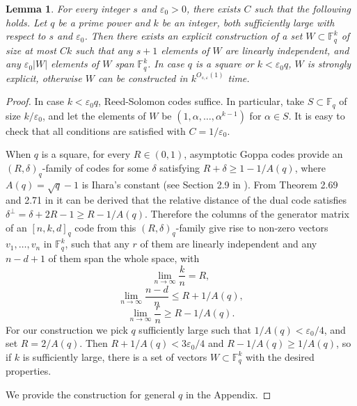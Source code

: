 \documentclass[11pt]{article}
\theoremstyle{plain}
\newtheorem{lemma}[theorem]{Lemma}
\theoremstyle{definition}
\begin{document}
\begin{lemma}\label{lemma:constr1}
For every integer $s$ and $\varepsilon_0>0$, there exists $C$ such that the following holds. 
Let $q$ be a prime power and $k$ be an integer, both sufficiently large with respect to $s$ and $\varepsilon_0$. Then there exists an explicit construction of a set $W\subset \mathbb{F}_q^k$ of size at most $Ck$ such that any $s+1$ elements of $W$ are linearly independent, and any $\varepsilon_0 |W|$ elements of $W$ span $\mathbb{F}_q^k$. In case $q$ is a square or $k<\varepsilon_0 q$, $W$ is strongly explicit, otherwise $W$ can be constructed in $k^{O_{s,\varepsilon}(1)}$ time.
\end{lemma}
\begin{proof}
    In case $k<\varepsilon_0 q$, Reed-Solomon codes suffice. In particular, take $S\subset \mathbb{F}_q$ of size $k/\varepsilon_0$, and let the elements of $W$ be $(1,\alpha,\dots,\alpha^{k-1})$ for $\alpha\in S$. It is easy to check that all conditions are satisfied with $C=1/\varepsilon_0$.
    
    When $q$ is a square, for every $R\in (0,1)$, asymptotic Goppa codes provide an $(R,\delta)_q$-family of codes for some $\delta$ satisfying $R+\delta \geq  1-1/A(q)$, where $A(q)=\sqrt{q}-1$ is Ihara's constant (see Section 2.9 in \cite{hoholdt1998algebraic}). 
    From Theorem 2.69 and 2.71 in \cite{hoholdt1998algebraic} it can be derived that the relative distance of the dual code satisfies 
$\delta^\perp = \delta + 2R - 1 \geq R - 1/A(q)$.
Therefore the columns of the generator matrix of an $[n, k, d]_q$ code from this $(R,\delta)_q$-family give rise to non-zero vectors 
$v_1, \dots, v_n$ in $\mathbb{F}_q^k$, such that any $r$ of them are linearly independent and any $n - d + 1$ of them span the whole space, with 
\[\lim_{n \rightarrow \infty} \frac{k}{n} = R,\]
\[\lim_{n \rightarrow \infty} \frac{n - d}{n} \leq R + 1/A(q),\]
\[\lim_{n \rightarrow \infty} \frac{r}{n} \geq R - 1/A(q).\] 
For our construction we pick $q$ sufficiently large such that $1/A(q)<\varepsilon_0/4$, and set $R=2/A(q)$. Then $R+1/A(q)<3\varepsilon_0/4$ and $R-1/A(q)\geq 1/A(q)$, so if $k$ is sufficiently large, there is a set of vectors $W\subset \mathbb{F}_q^k$ with the desired properties. 

We provide the construction for general $q$ in the Appendix.
\end{proof}
\end{document}
